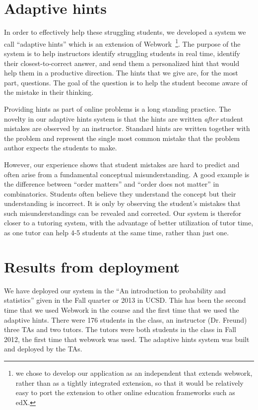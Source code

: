 \documentclass{sigchi}
\begin{document}
\section{Adaptive hints}
In order to effectively help these struggling students, we developed a
system we call ``adaptive hints'' which is an extension of
Webwork~\footnote{we chose to develop our application as an
  independent that extends webwork, rather than as a tightly
  integrated extension, so that it would be relatively easy to port
  the extension to other online education frameworks such as
  edX.}. The purpose of the system is to help instructors identify
struggling students in real time, identify their closest-to-correct
answer, and send them a personalized hint that would help them in a
productive direction. The hints that we give are, for the most part,
questions. The goal of the question is to help the student become
aware of the mistake in their thinking.

Providing hints as part of online problems is a long standing
practice. The novelty in our adaptive hints system is that the hints 
are written {\em after} student mistakes are observed by an instructor.
Standard hints are written together with the problem and represent the
single most common mistake that the problem author expects the
students to make.

However, our experience shows that student mistakes are hard to
predict and often arise from a fundamental conceptual
misunderstanding. A good example is the difference between ``order
matters'' and ``order does not matter'' in combinatorics.
Students often believe they understand the concept but their
understanding is incorrect. It is only by observing the student's 
mistakes that such misunderstandings can be revealed and corrected.
Our system is therefor closer to a tutoring system, with the advantage
of better utilization of tutor time, as one tutor can help 4-5
students at the same time, rather than just one.

\section{Results from deployment}
We have deployed our system in the ``An introduction to probability and
statistics'' given in the Fall quarter or 2013 in UCSD. This has been
the second time that we used Webwork in the course and the first time
that we used the adaptive hints. There were 176 students in the class,
an instructor (Dr. Freund) three TAs and two tutors. The tutors were
both students in the class in Fall 2012, the first time that webwork
was used. The adaptive hints system was built and deployed by the TAs.
\end{document}
